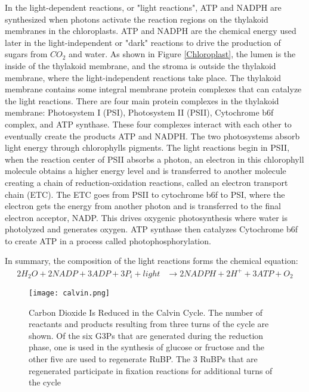 \documentclass[12pt,reqno]{amsart}
\begin{document}
	In the light-dependent reactions, or "light reactions", ATP and NADPH 	
	are synthesized when photons activate the reaction regions
	on the thylakoid membranes in the chloroplasts. ATP and NADPH
	are the chemical energy used later in the light-independent or "dark"
	reactions to drive the production of sugars from $CO_2$ and water.
	As shown in Figure \ref{Chloroplast}, the lumen is the inside 
	of the thylakoid membrane, and the stroma is outside the thylakoid 
	membrane, where the light-independent reactions take place. The 
	thylakoid membrane contains some integral membrane protein complexes 
	that can catalyze the light reactions. There are four main protein 
	complexes in the thylakoid membrane: Photosystem I (PSI), 
	Photosystem II (PSII), Cytochrome b6f complex, and ATP synthase. 
	These four complexes interact with each other to eventually create 
	the products ATP and NADPH. The two photosystems absorb light energy 
	through chlorophylls pigments. The light reactions begin in PSII, 
	when the reaction center of PSII absorbs a photon, an electron in 
	this chlorophyll molecule obtains a higher energy level and is 
	transferred to another molecule creating a chain of reduction-oxidation 
	reactions, called an electron transport chain (ETC). The ETC goes from 
	PSII to cytochrome b6f to PSI, where the electron gets the 
	energy from another photon and is transferred to the final 
	electron acceptor, NADP. This drives oxygenic photosynthesis 
	where water is photolyzed and generates oxygen. ATP synthase then
	catalyzes Cytochrome b6f to create ATP in a process called 
	photophosphorylation.
	
	In summary, the composition of the light reactions 
	forms the chemical equation:	
	\begin{align}
	    2 H_2O + 2 NADP + 3 ADP + 3 P_i + light &\rightarrow
	    2 NADPH + 2 H^+ + 3 ATP + O_2
	\end{align}


    
     \begin{figure}[h!]
        \caption{Carbon Dioxide Is Reduced in the Calvin Cycle. 
                 The number of reactants and products resulting from 
                 three turns of the cycle are shown. Of the six G3Ps 
                 that are generated during the reduction phase, one is 
                 used in the synthesis of glucose or fructose and the 
                 other five are used to regenerate RuBP. The 3 RuBPs 
                 that are regenerated participate in fixation reactions 
                 for additional turns of the cycle}
        \centering
        \texttt{[image: calvin.png]}
        \label{CalvinCycle}
    \end{figure}
    
\end{document}
